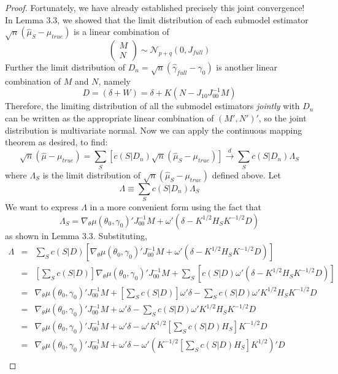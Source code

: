 \begin{proof}
Fortunately, we have already established precisely this joint convergence! In Lemma 3.3, we showed that the limit distribution of each submodel estimator $\sqrt{n}\left( \hat{\mu}_S -\mu_{true} \right)$ is a linear combination of
	$$
	\left(\begin{array}{c}M \\ N \end{array}\right) \sim \mathcal{N}_{p+q}(0, J_{full})
$$
Further the limit distribution of $D_n = \sqrt{n}\left( \hat{\gamma}_{full} - \gamma_0 \right)$ is another linear combination of $M$ and $N$, namely 
	$$D = (\delta + W) = \delta + K\left(N - J_{10}J_{00}^{-1}M\right)$$
Therefore, the limiting distribution of all the submodel estimators \emph{jointly} with $D_n$ can be written as the appropriate linear combination of $(M',N')'$, so the joint distribution is multivariate normal. Now we can apply the continuous mapping theorem as desired, to find:
	$$
\sqrt{n}\left( \hat{\mu} -\mu_{true} \right) = \sum_S \left[ c(S|D_n) \sqrt{n}\left( \hat{\mu}_S -\mu_{true} \right)  \right] \overset{d}{\rightarrow} \sum_S c(S|D_n) \Lambda_S
$$
where $\Lambda_S$ is the limit distribution of $\sqrt{n}\left( \hat{\mu}_S -\mu_{true} \right)$ defined above. Let
	$$\Lambda \equiv \sum_S c(S|D_n) \Lambda_S$$
We want to express $\Lambda$ in a more convenient form using the fact that
	$$\Lambda_S = \nabla_{\theta}\mu(\theta_0, \gamma_0)'J_{00}^{-1}M + \omega'\left(\delta -K^{1/2}H_S K^{-1/2}D\right)$$
as shown in Lemma 3.3. Substituting,
	\begin{eqnarray*}
	\Lambda &=& \sum_S c(S|D) \left[\nabla_{\theta}\mu(\theta_0, \gamma_0)'J_{00}^{-1}M + \omega'\left(\delta -K^{1/2}H_S K^{-1/2}D\right)  \right] \\
			&=&\left[ \sum_S c(S|D)\right]\nabla_{\theta}\mu(\theta_0, \gamma_0)'J_{00}^{-1}M+  \sum_S \left[c(S|D)\omega'\left(\delta -K^{1/2}H_S K^{-1/2}D\right) \right] \\
			&=&\nabla_{\theta}\mu(\theta_0, \gamma_0)'J_{00}^{-1}M+  \left[\sum_S c(S|D)\right]\omega'\delta - \sum_S c(S|D)\omega 'K^{1/2}H_S K^{-1/2}D \\
			&=&\nabla_{\theta}\mu(\theta_0, \gamma_0)'J_{00}^{-1}M+  \omega'\delta - \sum_S c(S|D)\omega 'K^{1/2}H_S K^{-1/2}D \\
			&=&\nabla_{\theta}\mu(\theta_0, \gamma_0)'J_{00}^{-1}M+  \omega'\delta - \omega 'K^{1/2}\left[ \sum_S c(S|D)H_S\right] K^{-1/2}D \\
			&=&\nabla_{\theta}\mu(\theta_0, \gamma_0)'J_{00}^{-1}M+  \omega'\delta - \omega '\left(K^{-1/2}\left[ \sum_S c(S|D)H_S\right] K^{1/2}\right)'D \\

\end{eqnarray*}
\end{proof}
